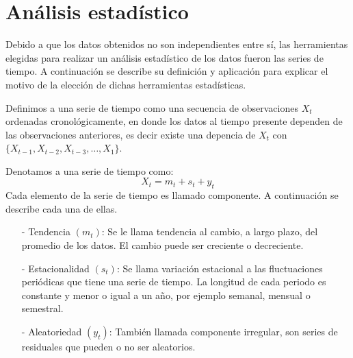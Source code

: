 \chapter{Análisis estadístico}




Debido a que los datos obtenidos no son independientes entre sí, las herramientas elegidas para realizar un análisis estadístico de los datos fueron las series de tiempo. A continuación se describe su definición y aplicación para explicar el motivo de la elección de dichas herramientas estadísticas.

Definimos a una serie de tiempo como una secuencia de observaciones $X_{t}$ ordenadas cronológicamente, en donde los datos al tiempo presente dependen de las observaciones anteriores, es decir existe una depencia de $X_{t}$ con $\{X_{t-1}, X_{t-2}, X_{t-3}, \ldots, X_{1}\}$.

Denotamos a una serie de tiempo como:
\begin{equation}
X_{t} = m_{t} + s_{t} + y_{t}
\end{equation}
Cada elemento de la serie de tiempo es llamado componente. A continuación se describe cada una de ellas.

\begin{itemize}
\item[-] Tendencia $(m_{t})$: Se le llama tendencia al cambio, a largo plazo, del promedio de los datos. El cambio puede ser creciente o decreciente.

\item[-] Estacionalidad $(s_{t})$: Se llama variación estacional a las fluctuaciones periódicas que tiene una serie de tiempo. La longitud de cada periodo es constante y menor o igual a un año, por ejemplo semanal, mensual o semestral.

\item[-] Aleatoriedad $(y_{t})$: También llamada componente irregular, son series de residuales que pueden o no ser aleatorios.
\end{itemize}

